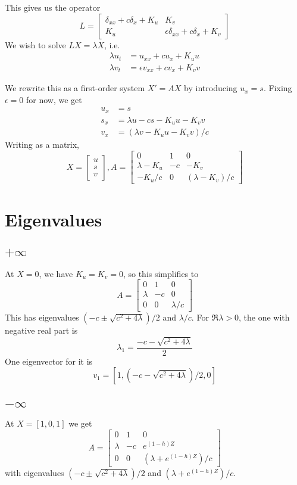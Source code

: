 \documentclass[10pt]{article}
\begin{document}
This gives us the operator
\[
L = \begin{bmatrix}
\delta_{xx} + c \delta_x + K_u  &  K_v  \\
K_u  &  \epsilon \delta_{xx} + c \delta_x + K_v
\end{bmatrix}
\]
We wish to solve $LX = \lambda X$, i.e.
\begin{align}
\lambda u_t &= u_{xx} + c u_x + K_u u \\
\lambda v_t &= \epsilon v_{xx} + c v_x+ K_v v
\end{align}

We rewrite this as a first-order system $X' = AX$ by introducing $u_x = s$.  Fixing $\epsilon=0$ for now, we get
\begin{align}
u_x &= s \\
s_x &= \lambda u - c s - K_u u - K_v v \\
v_x &= (\lambda v - K_u u - K_v v)/c
\end{align}
Writing as a matrix,
\[
X = \begin{bmatrix}u\\s\\v\end{bmatrix},
A = \begin{bmatrix}
0 & 1 & 0 \\
\lambda - K_u  &  -c  &  -K_v \\
- K_u/c  &  0  &  (\lambda - K_v)/c
\end{bmatrix}
\]

\section{Eigenvalues}
\subsection{$+\infty$}
At $X = 0$, we have $K_u = K_v = 0$, so this simplifies to
\[
A = \begin{bmatrix}
0 & 1 & 0 \\
\lambda &  -c  &  0 \\
0 &  0  &  \lambda/c
\end{bmatrix}
\]
This has eigenvalues $(-c \pm \sqrt{c^2 + 4 \lambda})/2$ and $\lambda/c$.  For $\Re \lambda > 0$, the one with negative real part is
\[\lambda_1 = \frac{-c - \sqrt{c^2 + 4 \lambda}}{2}\]
One eigenvector for it is
\[v_1 = [1,(-c - \sqrt{c^2 + 4 \lambda})/2,0] \]

\subsection{$-\infty$}
At $X = [1,0,1]$ we get
\[
A = \begin{bmatrix}
0 & 1 & 0 \\
\lambda &  -c  &  e^{(1-h)Z} \\
0 &  0  &  (\lambda + e^{(1-h)Z})/c
\end{bmatrix}
\]
with eigenvalues $(-c \pm \sqrt{c^2 + 4 \lambda})/2$ and $(\lambda + e^{(1-h)Z})/c$.
\end{document}
